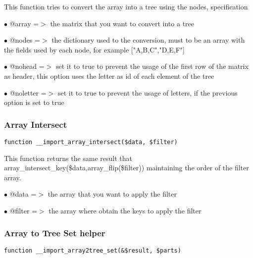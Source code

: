 \documentclass[a4paper]{article}
\begin{document}
This function tries to convert the array into a tree using the nodes,
specification

\begin{compactitem}
\item[\color{myblue}$\bullet$] @array    =$>$ the matrix that you want to convert into a tree
\item[\color{myblue}$\bullet$] @nodes    =$>$ the dictionary used to the conversion, must to be an array with
             the fields used by each node, for example ["A,B,C","D,E,F"]
\item[\color{myblue}$\bullet$] @nohead   =$>$ set it to true to prevent the usage of the first row of the
             matrix as header, this option uses the letter as id of each
             element of the tree
\item[\color{myblue}$\bullet$] @noletter =$>$ set it to true to prevent the usage of letters, if the
             previous option is set to true
\end{compactitem}

\hypertarget{toc474}{}
\subsubsection{Array Intersect}

\begin{lstlisting}
function __import_array_intersect($data, $filter)
\end{lstlisting}

This function returns the same result that array\_intersect\_key(\$data,array\_flip(\$filter))
maintaining the order of the filter array.

\begin{compactitem}
\item[\color{myblue}$\bullet$] @data   =$>$ the array that you want to apply the filter
\item[\color{myblue}$\bullet$] @filter =$>$ the array where obtain the keys to apply the filter
\end{compactitem}

\hypertarget{toc475}{}
\subsubsection{Array to Tree Set helper}

\begin{lstlisting}
function __import_array2tree_set(&$result, $parts)
\end{lstlisting}
\end{document}
